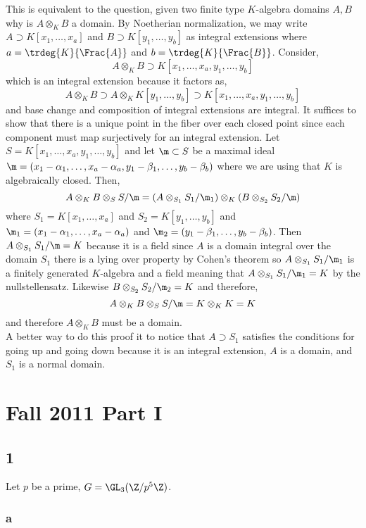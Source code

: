 \documentclass[12pt]{article}
\begin{document}
This is equivalent to the question, given two finite type $K$-algebra domains $A,B$ why is $A \otimes_K B$ a domain. By Noetherian normalization, we may write $A \supset K[x_1, \dots, x_a]$ and $B \supset K[y_1, \dots, y_b]$ as integral extensions where $a = \trdeg{K}{\Frac{A}}$ and $b = \trdeg{K}{\Frac{B}}$. Consider,
\[ A \otimes_K B \supset K[x_1, \dots, x_a, y_1, \dots, y_b] \]
which is an integral extension because it factors as,
\[ A \otimes_K B  \supset A \otimes_K K[y_1, \dots, y_b] \supset K[x_1, \dots, x_a, y_1, \dots, y_b] \] 
and base change and composition of integral extensions are integral. It suffices to show that there is a unique point in the fiber over each closed point since each component must map surjectively for an integral extension. Let $S = K[x_1, \dots, x_a, y_1, \dots, y_b]$ and let $\m \subset S$ be a maximal ideal $\m = (x_1 - \alpha_1, \dots, x_a - \alpha_a, y_1 - \beta_1, \dots, y_b - \beta_b)$ where we are using that $K$ is algebraically closed. Then,
\[ A \otimes_K B \otimes_S  S / \m = (A \otimes_{S_1} S_1 / \m_1) \otimes_K (B \otimes_{S_2} S_2 / \m) \]
where $S_1 = K[x_1, \dots, x_a]$ and $S_2 = K[y_1, \dots, y_b]$ and $\m_1 = (x_1 - \alpha_1, \dots, x_a - \alpha_a)$ and $\m_2 = (y_1 - \beta_1, \dots, y_b - \beta_b)$. Then $A \otimes_{S_1} S_1 / \m = K$ because it is a field since $A$ is a domain integral over the domain $S_1$ there is a lying over property by Cohen's theorem so $A \otimes_{S_1} S_1 / \m_1$ is a finitely generated $K$-algebra and a field meaning that $A \otimes_{S_1} S_1 / \m_1 = K$ by the nullstellensatz. Likewise $B \otimes_{S_2} S_2 / \m_2 = K$ and therefore,
\[ A \otimes_K B \otimes_S S / \m = K \otimes_K K = K \]
and therefore $A \otimes_K B$ must be a domain.
\bigskip\\
A better way to do this proof it to notice that $A \supset S_1$ satisfies the conditions for going up and going down because it is an integral extension, $A$ is a domain, and $S_1$ is a normal domain. 

\section{Fall 2011 Part I}

\subsection{1}

Let $p$ be a prime, $G = \GL_{3}(\Z / p^5 \Z)$. 

\subsubsection{a}
\end{document}
